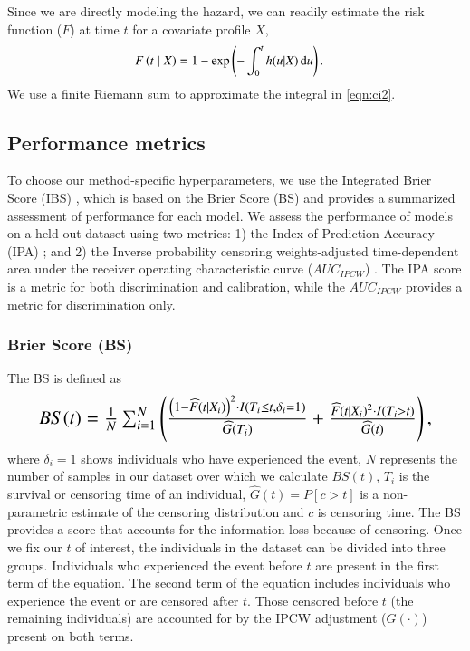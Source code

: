 \documentclass[preprint,12pt,authoryear]{elsarticle}
\begin{document}
Since we are directly modeling the hazard, we can readily estimate the risk function (\(F\)) at time \(t\) for a covariate profile \(X\),
\begin{align}\label{eqn:ci2}
F\left(t\mid X\right)& = 1 - \exp\left(-\int_{0}^{t}h(u|X) \,\textrm du\right).
\end{align} We use a finite Riemann sum \citep{hughes2020calculus} to approximate the integral in \eqref{eqn:ci2}.

\hypertarget{performance-metrics}{%
\subsection{Performance metrics}\label{performance-metrics}}

To choose our method-specific hyperparameters, we use the Integrated Brier Score (IBS) \citep{graf1999}, which is based on the Brier Score (BS) and provides a summarized assessment of performance for each model. We assess the performance of models on a held-out dataset using two metrics: 1) the Index of Prediction Accuracy (IPA) \citep{kattan2018index}; and 2) the Inverse probability censoring weights-adjusted time-dependent area under the receiver operating characteristic curve ($AUC_{IPCW}$) \citep{auc}. The IPA score is a metric for both discrimination and calibration, while the $AUC_{IPCW}$ provides a metric for discrimination only.

\hypertarget{bs}{%
\subsubsection{Brier Score (BS)}\label{bs}}
The BS \citep{graf1999} is defined as \begin{align}\label{eqn:bs}
\resizebox{0.9\hsize}{!}{$%
BS(t)=\frac{1}{N}\sum^{N}_{i=1}\left(\frac{\left(1 - \widehat{F}(t \mid X_{i})\right)^{2}\cdot I(T_{i}\leq t,\delta_{i}=1)}{\widehat{G}(T_{i})} + \frac{\widehat{F}(t\mid X_{i})^{2}\cdot I(T_{i}>t)}{\widehat{G}(t)}\right),
$%
}%
\end{align} where \(\delta_{i}=1\) shows individuals who have experienced the event, \(N\) represents the number of samples in our dataset over which we calculate \(BS(t)\), \(T_{i}\) is the survival or censoring time of an individual, \(\widehat{G}(t)=P[c>t]\) is a non-parametric estimate of the censoring distribution and \(c\) is censoring time. The BS provides a score that accounts for the information loss because of censoring. Once we fix our \(t\) of interest, the individuals in the dataset can be divided into three groups. Individuals who experienced the event before \(t\) are present in the first term of the equation. The second term of the equation includes individuals who experience the event or are censored after \(t\). Those censored before \(t\) (the remaining individuals) are accounted for by the IPCW adjustment (\(G(\cdot)\)) present on both terms.
\end{document}
